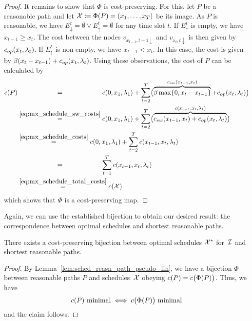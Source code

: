 \begin{proof}
It remains to show that $\Phi$ is cost-preserving. For this, let $P$ be a reasonable path and let $\mathcal{X}\coloneqq\Phi(P)=(x_1,\dotsc,x_T)$ be its image. 
As $P$ is reasonable, we have $E_\downarrow^t=\emptyset \lor E_\uparrow^t=\emptyset$ for any time slot $t$. If $E_\uparrow^t$ is empty, we have $x_{t-1}\ge x_t$. The cost between the nodes $v_{x_{t-1},t-1\downarrow}$ and $v_{x_t,t\downarrow}$ is then given by $c_{op}(x_t,\lambda_t)$. If $E_\uparrow^t$ is non-empty, we have $x_{t-1}<x_t$. In this case, the cost is given by $\beta(x_t-x_{t-1})+c_{op}(x_t,\lambda_t)$. Using these observations, the cost of $P$ can be calculated by 
\begin{align*}
	\costs(P)&\stackrel{\phantom{\eqref{eq:mx_schedule_sw_costs}}}{=}\costs(0,x_1,\lambda_1)+\sum\limits_{t=2}^{T}\bigl(\overbrace{\beta\max\{0,x_t-x_{t-1}\}}^{\swcosts(x_{t-1},x_t)}+\opcosts(x_{t},\lambda_t)\bigr)\\
	&\stackrel{\eqref{eq:mx_schedule_sw_costs}}{=}c(0,x_1,\lambda_1)+\sum\limits_{t=2}^{T}\bigl(\overbrace{\swcosts(x_{t-1},x_t)+\opcosts(x_{t},\lambda_t)}^{\costs(x_{t-1},x_t,\lambda_t)}\bigr)\\
	&\stackrel{\eqref{eq:mx_schedule_costs}}{=}c(0,x_1,\lambda_1)+\sum\limits_{t=2}^{T}\costs(x_{t-1},x_t,\lambda_t)\\
	&\stackrel{\phantom{\eqref{eq:mx_schedule_sw_costs}}}{=}\sum\limits_{t=1}^{T}\costs(x_{t-1},x_t,\lambda_t)\\
	&\stackrel{\eqref{eq:mx_schedule_total_costs}}{=}c(\mx)
\end{align*}
which shows that $\Phi$ is a cost-preserving map.
\end{proof}
Again, we can use the established bijection to obtain our desired result: the correspondence between optimal schedules and shortest reasonable paths.
\begin{thm}\label{thm:opt_sched_reasn_path}
There exists a cost-preserving bijection between optimal schedules $\mathcal{X}^*$ for~$\mathcal{I}$ and shortest reasonable paths.
\end{thm} 
\begin{proof}
By Lemma~\ref{lem:sched_reasn_path_pseudo_lin}, we have a bijection $\Phi$ between reasonable paths $P$ and schedules~$\mathcal{X}$ obeying $c(P)=c\bigl(\Phi(P)\bigr)$. Thus, we have 
\begin{equation*}
	c(P)\text{ minimal}\iff c\bigl(\Phi(P)\big)\text{ minimal}
\end{equation*}
and the claim follows.
\end{proof}
